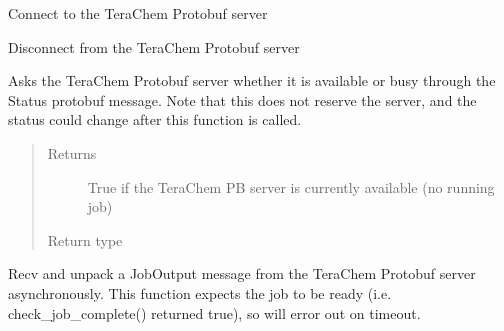 \documentclass[letterpaper,10pt,english]{sphinxmanual}
\begin{document}
\begin{fulllineitems}
\begin{fulllineitems}
\begin{quote}
\begin{description}
\end{description}\end{quote}

\end{fulllineitems}


\begin{fulllineitems}
\label{\detokenize{tcpb:tcpb.tcpb.TCProtobufClient.connect}}
Connect to the TeraChem Protobuf server

\end{fulllineitems}


\begin{fulllineitems}
\label{\detokenize{tcpb:tcpb.tcpb.TCProtobufClient.disconnect}}
Disconnect from the TeraChem Protobuf server

\end{fulllineitems}


\begin{fulllineitems}
\label{\detokenize{tcpb:tcpb.tcpb.TCProtobufClient.is_available}}
Asks the TeraChem Protobuf server whether it is available or busy through the Status protobuf message.
Note that this does not reserve the server, and the status could change after this function is called.
\begin{quote}\begin{description}
\item[{Returns}] \leavevmode
True if the TeraChem PB server is currently available (no running job)

\item[{Return type}] \leavevmode
{}

\end{description}\end{quote}

\end{fulllineitems}


\begin{fulllineitems}
\label{\detokenize{tcpb:tcpb.tcpb.TCProtobufClient.recv_job_async}}
Recv and unpack a JobOutput message from the TeraChem Protobuf server asynchronously.
This function expects the job to be ready (i.e. check\_job\_complete() returned true),
so will error out on timeout.


\end{fulllineitems}
\end{fulllineitems}
\end{document}
